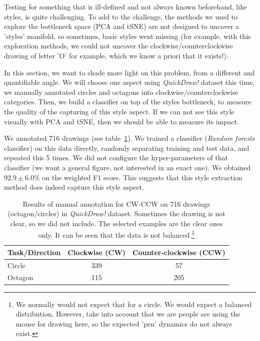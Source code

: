 \par Testing for something that is ill-defined and not always known beforehand, like styles, is quite challenging. To add to the challenge, the methods we used to explore the bottleneck space (PCA and tSNE) are not designed to uncover a 'styles' manifold, so sometimes, basic styles went missing (for example, with this exploration methods, we could not uncover the clockwise/counterclockwise drawing of letter 'O' for example, which we know a priori that it exists!).

\par In this section, we want to shade more light on this problem, from a different and quantifiable angle. We will choose one aspect using \textit{QuickDraw!} dataset this time, we manually annotated circles and octagons into clockwise/counterclockwise categories. Then, we build a classifier on top of the styles bottleneck, to measure the quality of the capturing of this style aspect. If we can not see this style visually with PCA and tSNE, then we should be able to measure its impact.

\par We annotated 716 drawings (see table~\ref{table:cw_ccw_annotation}). We trained a classifier (\textit{Random forests} classifier) on this data directly, randomly separating training and test data, and repeated this 5 times. We did not configure the hyper-parameters of that classifier (we want a general figure, not interested in an exact one). We obtained $92.9 \pm 6.0 \%$ on the weighted F1 score. This suggests that this style extraction method does indeed capture this style aspect.

\begin{table}[!htbp]
  \centering
  \begin{tabular}{l c c}
  \hline
  Task/Direction & Clockwise (CW) & Counter-clockwise (CCW)\\ \hline
  Circle &  339 & 57 \\ %
  Octagon & 115 & 205 \\ \hline
  \end{tabular}
  \caption{Results of manual annotation for CW-CCW on 716 drawings (octagon/circles) in \textit{QuickDraw!} dataset. Sometimes the drawing is not clear, so we did not include. The selected examples are the clear ones only. It can be seen that the data is not balanced.\footnote{We normally would not expect that for a circle. We would expect a balanced distribution. However, take into account that we are people are using the mouse for drawing here, so the expected 'pen' dynamics do not always exist.}}
  \label{table:cw_ccw_annotation}
\end{table}


